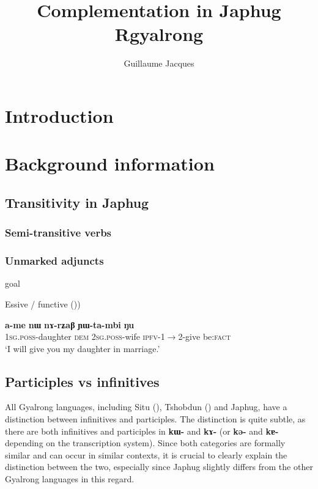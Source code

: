 \documentclass[oldfontcommands,oneside,a4paper,11pt]{article}
\newcommand{\ipa}[1]{\textbf{\phon#1}} %
\begin{document}
 

\title{Complementation in Japhug Rgyalrong}%
\author{Guillaume Jacques}
\maketitle
\linenumbers
 
 
\section{Introduction}
 \citet[9]{dixon06complementation}
 \citet{sun12complementation}
 \citet{jacques08}

\section{Background information}

\subsection{Transitivity in Japhug} \label{sec:transitivity}


\subsubsection{Semi-transitive verbs}

\subsubsection{Unmarked adjuncts}

goal


Essive / functive (\citealt{creissels14functive}))
\begin{exe}
\ex \label{ex:YWtambi}
\gll \ipa{a-me} 	\ipa{nɯ} 	\ipa{nɤ-rʑaβ} 	\ipa{ɲɯ-ta-mbi} 	\ipa{ŋu} \\
\textsc{1sg.poss}-daughter \textsc{dem} \textsc{2sg.poss}-wife \textsc{ipfv}-1$\rightarrow$2-give be:\textsc{fact} \\
\glt `I will give you my daughter in marriage.'
\end{exe}

\subsection{Participles vs infinitives} \label{sec:part.inf}
All Gyalrong languages, including Situ (\citealt{youjing03zhuokeji}), Tshobdun (\citealt{sun12complementation}) and Japhug, have a distinction between infinitives and participles. The distinction is quite subtle, as there are both infinitives and participles in \ipa{kɯ-} and \ipa{kɤ-} (or \ipa{kə-} and \ipa{kɐ-} depending on the transcription system). Since both categories are formally similar and can occur in similar contexts, it is crucial to clearly explain the distinction between the two, especially since Japhug slightly differs from the other Gyalrong languages in this regard.
\end{document}
